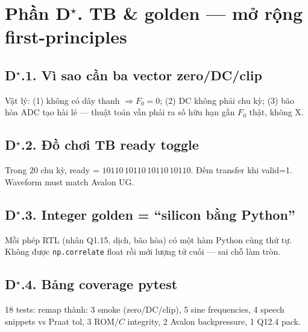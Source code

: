 
\newpage
\section*{Phần D$^\star$. TB \& golden --- mở rộng first-principles}

\subsection*{D$^\star$.1. Vì sao cần ba vector zero/DC/clip}
Vật lý: (1) không có dây thanh $\Rightarrow F_0=0$; (2) DC không phải chu kỳ; (3) bão hòa ADC tạo hài lẻ --- thuật toán vẫn phải ra số hữu hạn gần $F_0$ thật, không X.

\subsection*{D$^\star$.2. Đồ chơi TB ready toggle}
Trong 20 chu kỳ, ready = $10110\,10110\,10110\,10110$. Đếm transfer khi valid=1. Waveform must match Avalon UG.

\subsection*{D$^\star$.3. Integer golden = ``silicon bằng Python''}
Mỗi phép RTL (nhân Q1.15, dịch, bão hòa) có một hàm Python cùng thứ tự. Không được \texttt{np.correlate} float rồi mới lượng tử cuối --- sai chỗ làm tròn.

\subsection*{D$^\star$.4. Bảng coverage pytest}
18 tests: remap thành: 3 smoke (zero/DC/clip), 5 sine frequencies, 4 speech snippets vs Praat tol, 3 ROM/$C$ integrity, 2 Avalon backpressure, 1 Q12.4 pack.

